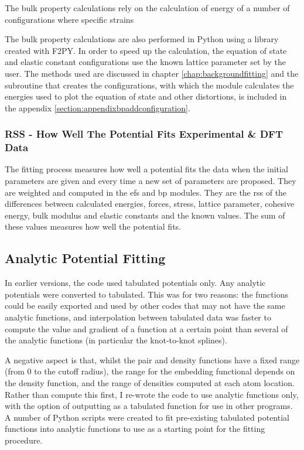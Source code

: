 The bulk property calculations rely on the calculation of energy of a number of configurations where specific strains


The bulk property calculations are also performed in Python using a library created with F2PY.  In order to speed up the calculation, the equation of state and elastic constant configurations use the known lattice parameter set by the user.  The methods used are discussed in chapter \ref{chap:backgroundfitting} and the subroutine that creates the configurations, with which the module calculates the energies used to plot the equation of state and other distortions, is included in the appendix \ref{section:appendixbpaddconfiguration}.


\subsubsection{RSS - How Well The Potential Fits Experimental \& DFT Data}

The fitting process measures how well a potential fits the data when the initial parameters are given and every time a new set of parameters are proposed.  They are weighted and computed in the efs and bp modules.  They are the \acrfull{rss} of the differences between calculated energies, forces, stress, lattice parameter, cohesive energy, bulk modulus and elastic constants and the known values.  The sum of these values measures how well the potential fits.


\subsection{Analytic Potential Fitting}

In earlier versions, the code used tabulated potentials only.  Any analytic potentials were converted to tabulated.  This was for two reasons: the functions could be easily exported and used by other codes that may not have the same analytic functions, and interpolation between tabulated data was faster to compute the value and gradient of a function at a certain point than several of the analytic functions (in particular the knot-to-knot splines).  

A negative aspect is that, whilst the pair and density functions have a fixed range (from 0 to the cutoff radius), the range for the embedding functional depends on the density function, and the range of densities computed at each atom location.  Rather than compute this first, I re-wrote the code to use analytic functions only, with the option of outputting as a tabulated function for use in other programs.  A number of Python scripts were created to fit pre-existing tabulated potential functions into analytic functions to use as a starting point for the fitting procedure.


